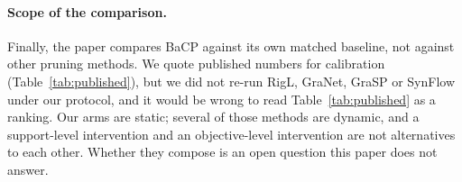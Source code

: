 \paragraph{Scope of the comparison.}
Finally, the paper compares BaCP against its own matched baseline, not against
other pruning methods. We quote published numbers for calibration
(Table~\ref{tab:published}), but we did not re-run RigL, GraNet, GraSP or SynFlow
under our protocol, and it would be wrong to read Table~\ref{tab:published} as a
ranking. Our arms are static; several of those methods are dynamic, and a
support-level intervention and an objective-level intervention are not
alternatives to each other. Whether they compose is an open question this paper
does not answer.
